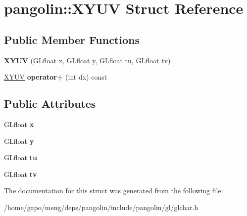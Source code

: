 \hypertarget{structpangolin_1_1_x_y_u_v}{}\section{pangolin\+:\+:X\+Y\+UV Struct Reference}
\label{structpangolin_1_1_x_y_u_v}
\subsection*{Public Member Functions}
\begin{DoxyCompactItemize}
\item 
{\bfseries X\+Y\+UV} (G\+Lfloat x, G\+Lfloat y, G\+Lfloat tu, G\+Lfloat tv)\hypertarget{structpangolin_1_1_x_y_u_v_a376b44b5b2c4afe9cb156a3d1c83232c}{}\label{structpangolin_1_1_x_y_u_v_a376b44b5b2c4afe9cb156a3d1c83232c}

\item 
\hyperlink{structpangolin_1_1_x_y_u_v}{X\+Y\+UV} {\bfseries operator+} (int dx) const \hypertarget{structpangolin_1_1_x_y_u_v_ac6aaef0906b982af8857c0cd9f2bea23}{}\label{structpangolin_1_1_x_y_u_v_ac6aaef0906b982af8857c0cd9f2bea23}

\end{DoxyCompactItemize}
\subsection*{Public Attributes}
\begin{DoxyCompactItemize}
\item 
G\+Lfloat {\bfseries x}\hypertarget{structpangolin_1_1_x_y_u_v_a7a9eebbc60f0f920d062439682c883dd}{}\label{structpangolin_1_1_x_y_u_v_a7a9eebbc60f0f920d062439682c883dd}

\item 
G\+Lfloat {\bfseries y}\hypertarget{structpangolin_1_1_x_y_u_v_a3df4d4f3cf2ca8f493bd9877a9f9229d}{}\label{structpangolin_1_1_x_y_u_v_a3df4d4f3cf2ca8f493bd9877a9f9229d}

\item 
G\+Lfloat {\bfseries tu}\hypertarget{structpangolin_1_1_x_y_u_v_a84b1ce52299b514bdcd8df734e66f0f6}{}\label{structpangolin_1_1_x_y_u_v_a84b1ce52299b514bdcd8df734e66f0f6}

\item 
G\+Lfloat {\bfseries tv}\hypertarget{structpangolin_1_1_x_y_u_v_a8cd26c360773d7132168b259a2527ce5}{}\label{structpangolin_1_1_x_y_u_v_a8cd26c360773d7132168b259a2527ce5}

\end{DoxyCompactItemize}


The documentation for this struct was generated from the following file\+:\begin{DoxyCompactItemize}
\item 
/home/gapo/meng/deps/pangolin/include/pangolin/gl/glchar.\+h\end{DoxyCompactItemize}
